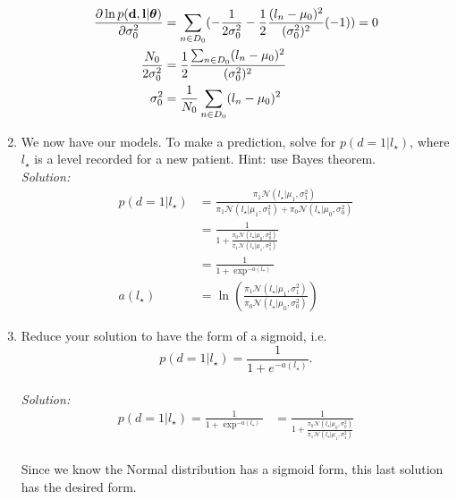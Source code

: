 \documentclass[12pt,a4paper]{article}
\newcommand{\thetavec}{\boldsymbol{\theta}}
\newcommand{\dvec}{{\bf d}}
\newcommand{\lvec}{{\bf l}}
\begin{document}
\begin{enumerate}
		  \begin{align*}
		  	\frac{\partial \ln p(\dvec, \lvec | \thetavec)}{\partial \sigma_{0}^{2}} &= \sum_{n \in D_{0}} (- \frac{1}{2 \sigma_{0}^{2}} - \frac{1}{2} \frac{(l_{n} - \mu_{0})^{2}}{(\sigma_{0}^{2})^{2}}(-1)) = 0 \\
		  	\frac{N_{0}}{2 \sigma_{0}^{2}} &= \frac{1}{2} \frac{\sum_{n \in D_{0}} (l_{n} - \mu_{0})^{2}}{(\sigma_{0}^{2}) ^{2}} \\
		  	\sigma_{0}^{2} &= \frac{1}{N_{0}} \sum_{n \in D_{0}} (l_{n} - \mu_{0})^{2}
		  \end{align*}
  
  \item We now have our models.  To make a prediction, solve for $p( d=1 | l_{\star})$, where $l_{\star}$ is a level recorded for a new patient.  Hint: use Bayes theorem. \\
	  \emph{Solution:} \\
		  \begin{align*}
		  	p(d = 1 | l_{\star}) &= \frac{\pi_1 \mathcal{N} (l_{\star} | \mu_{1}, \sigma_{1}^{2})}{\pi_1 \mathcal{N} (l_{\star} | \mu_{1}, \sigma_{1}^{2}) + \pi_0 \mathcal{N} (l_{\star} | \mu_{0}, \sigma_{0}^{2})} \\
		  	&= \frac{1}{1 + \frac{\pi_0 \mathcal{N} (l_{\star} | \mu_{0}, \sigma_{0}^{2})}{\pi_1 \mathcal{N} (l_{\star} | \mu_{1}, \sigma_{1}^{2})}} \\
		  	&= \frac{1}{1 + \exp^{-a(l_{\star})}} \\
		  	a(l_{\star}) &= \ln (\frac{\pi_1 \mathcal{N} (l_{\star} | \mu_{1}, \sigma_{1}^{2})}{\pi_0 \mathcal{N} (l_{\star} | \mu_{0}, \sigma_{0}^{2})})
		  \end{align*}
  
  
  \item Reduce your solution to have the form of a sigmoid, i.e. 
      \begin{equation*}
         p(d=1|l_{\star}) = \frac{1}{1+e^{-a(l_{\star})}}.
      \end{equation*}
      \\
	      \emph{Solution:} \\
		      \begin{align*}
		      	p(d = 1 | l_{\star}) = \frac{1}{1 + \exp ^{-a(l_{\star})}} 
		      	&= \frac{1}{1 + \frac{\pi_0 \mathcal{N} (l_{\star} | \mu_{0}, \sigma_{0}^{2})}{\pi_1 \mathcal{N} (l_{\star} | \mu_{1}, \sigma_{1}^{2})}} \\
		      \end{align*}
		      
		  Since we know the Normal distribution has a sigmoid form, this last solution has the desired form. 
   
  
\end{enumerate}
\end{document}
